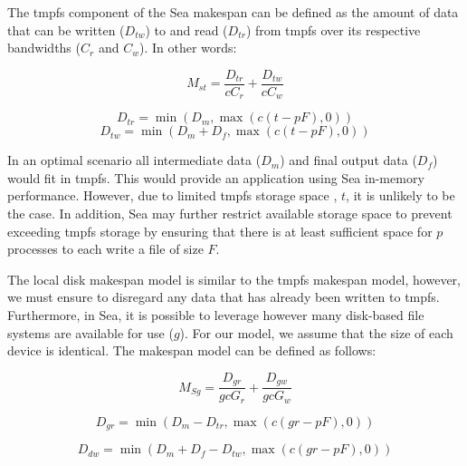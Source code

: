       The tmpfs component of the Sea makespan can be defined as the amount of
      data that can be written ($D_{tw}$) to and read ($D_{tr}$) from tmpfs over
      its respective bandwidths ($C_{r}$ and $C_{w}$). In other words:

      \begin{equation}\label{eq:mst}
          M_{st} = \frac{D_{tr}}{cC_{r}} + \frac{D_{tw}}{cC_{w}}
      \end{equation}

      \begin{equation*}\label{eq:dtr}
          D_{tr} = \min\left(D_{m}, \max{\left(c(t - pF), 0 \right)} \right)
      \end{equation*}
      \begin{equation*}\label{eq:dtw}
          D_{tw} = \min\left(D_{m} + D_{f}, \max{\left(c(t - pF), 0 \right)} \right)
      \end{equation*}

      In an optimal scenario all intermediate data ($D_{m}$) and final output
      data ($D_{f}$) would fit in tmpfs. This would provide an application using
      Sea in-memory performance. However, due to limited tmpfs storage space
      , $t$, it is unlikely to be the case. In addition, Sea may further
      restrict available storage space to prevent exceeding tmpfs storage by
      ensuring that there is at least sufficient space for $p$ processes to each
      write a file of size $F$.

      The local disk  makespan model is similar to the tmpfs makespan model,
      however, we must ensure to disregard any data that has already been
      written to tmpfs. Furthermore, in Sea, it is possible to leverage however
      many disk-based file systems are available for use ($g$). For our model,
      we assume that the size of each device is identical. The makespan model
      can be defined as follows:

      \begin{equation}\label{eq:msd}
          M_{Sg} =  \frac{D_{gr}}{gcG_{r}} + \frac{D_{gw}}{gcG_{w}}
      \end{equation}

      \begin{equation*}\label{eq:ddr}
          D_{gr} = \min{(D_{m} - D_{tr}, \max{(c(gr - pF),0)})}
      \end{equation*}

      \begin{equation*}\label{eq:ddw}
          D_{dw} = \min{(D_{m} + D_{f} - D_{tw}, \max{(c(gr - pF),0)})}
      \end{equation*}

